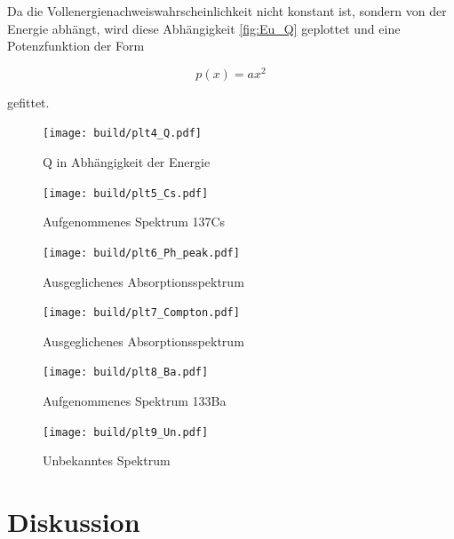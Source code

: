 Da die Vollenergienachweiswahrscheinlichkeit nicht konstant ist, sondern von der Energie abhängt, wird diese Abhängigkeit \eqref{fig:Eu_Q} geplottet 
und eine Potenzfunktion der Form

\begin{equation}
	p(x)=ax^2
\end{equation}

gefittet. 

\begin{figure}
    \centering
    \texttt{[image: build/plt4\_Q.pdf]}
	\caption{Q in Abhängigkeit der Energie}
	\label{fig:Eu_Q}
\end{figure}




\begin{figure}
    \centering
    \texttt{[image: build/plt5\_Cs.pdf]}
	\caption{Aufgenommenes Spektrum 137Cs}
	\label{fig:Cs_spektrum}
\end{figure}

\begin{figure}
    \centering
    \texttt{[image: build/plt6\_Ph\_peak.pdf]}
	\caption{Ausgeglichenes Absorptionsspektrum}
	\label{fig:Cs_peak}
\end{figure}

\begin{figure}
    \centering
    \texttt{[image: build/plt7\_Compton.pdf]}
	\caption{Ausgeglichenes Absorptionsspektrum}
	\label{fig:Compton}
\end{figure}

\begin{figure}
    \centering
    \texttt{[image: build/plt8\_Ba.pdf]}
	\caption{Aufgenommenes Spektrum 133Ba}
	\label{fig:Ba_spektrum}
\end{figure}

\begin{figure}
    \centering
    \texttt{[image: build/plt9\_Un.pdf]}
	\caption{Unbekanntes Spektrum}
	\label{fig:Un_spektrum}
\end{figure}




\section{Diskussion}

\newpage
\printbibliography

